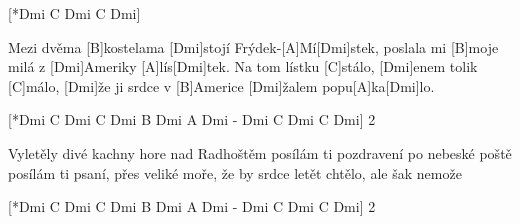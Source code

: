 
[*Dmi C Dmi C Dmi]

\sloka
Mezi dvěma [B]kostelama [Dmi]stojí Frýdek-[A]Mí[Dmi]stek,
poslala mi [B]moje milá z [Dmi]Ameriky [A]lís[Dmi]tek.
Na tom lístku [C]stálo, [Dmi]enem tolik [C]málo,
[Dmi]že ji srdce v [B]Americe [Dmi]žalem popu[A]ka[Dmi]lo.

[*Dmi C Dmi C Dmi B Dmi A Dmi - Dmi C Dmi C Dmi] 2\x

\sloka
Vyletěly divé kachny hore nad Radhoštěm
posílám ti pozdravení po nebeské poště
posílám ti psaní, přes veliké moře,
že by srdce letět chtělo, ale šak nemože

[*Dmi C Dmi C Dmi B Dmi A Dmi - Dmi C Dmi C Dmi] 2\x
